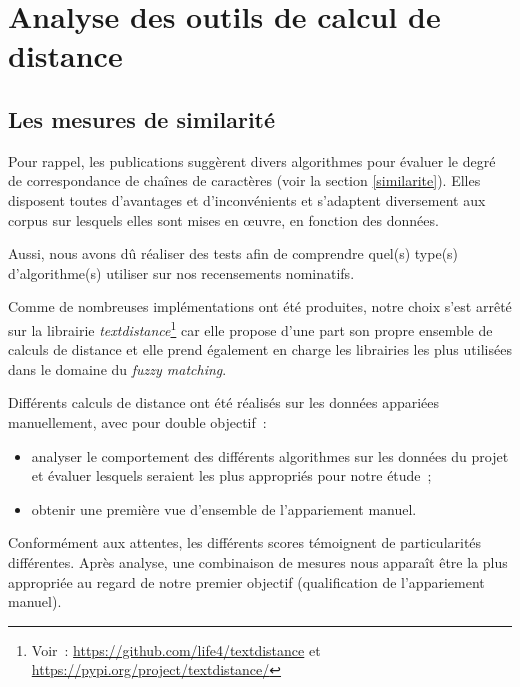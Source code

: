 \documentclass[a4paper,12pt,twoside]{book}
\begin{document}
        \section{Analyse des outils de calcul de distance}
	        
	       \subsection{Les mesures de similarité}
	            \label{sim}
	        
	            Pour rappel, les publications suggèrent divers algorithmes pour évaluer le degré de correspondance de chaînes de caractères (voir la section \ref{similarite}). Elles disposent toutes d'avantages et d'inconvénients et s'adaptent diversement aux corpus sur lesquels elles sont mises en œuvre, en fonction des données.
	            
	            Aussi, nous avons dû réaliser des tests afin de comprendre quel(s) type(s) d'algorithme(s) utiliser sur nos recensements nominatifs.
	            
	            Comme de nombreuses implémentations ont été produites, notre choix s'est arrêté sur la librairie \textit{textdistance}\footnote{Voir~: \url{https://github.com/life4/textdistance} et \url{https://pypi.org/project/textdistance/}} car elle propose d'une part son propre ensemble de calculs de distance et elle prend également en charge les librairies les plus utilisées dans le domaine du \textit{fuzzy matching}.
	            
	            Différents calculs de distance ont été réalisés sur les données appariées manuellement, avec pour double objectif~:
	            
	            \begin{itemize}
	                \item analyser le comportement des différents algorithmes sur les données du projet et évaluer lesquels seraient les plus appropriés pour notre étude~;
	                \item obtenir une première vue d'ensemble de l'appariement manuel.
	            \end{itemize}
	            
	            Conformément aux attentes, les différents scores témoignent de particularités différentes. Après analyse, une combinaison de mesures nous apparaît être la plus appropriée au regard de notre premier objectif (qualification de l'appariement manuel).
	            
\end{document}
